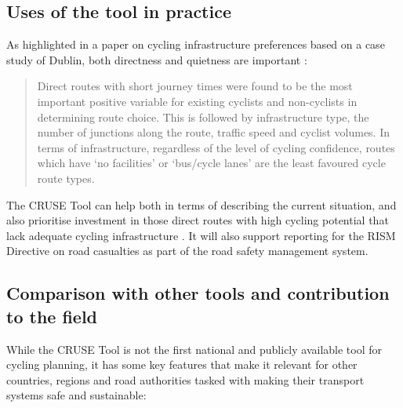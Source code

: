 \documentclass[
  super,
  preprint,
  3p]{elsarticle}
\begin{document}
\subsection{Uses of the tool in
practice}\label{uses-of-the-tool-in-practice}

As highlighted in a paper on cycling infrastructure preferences based on
a case study of Dublin, both directness and quietness are important
\citep{caulfield2012}:

\begin{quote}
Direct routes with short journey times were found to be the most
important positive variable for existing cyclists and non-cyclists in
determining route choice. This is followed by infrastructure type, the
number of junctions along the route, traffic speed and cyclist volumes.
In terms of infrastructure, regardless of the level of cycling
confidence, routes which have `no facilities' or `bus/cycle lanes' are
the least favoured cycle route types.
\end{quote}

The CRUSE Tool can help both in terms of describing the current
situation, and also prioritise investment in those direct routes with
high cycling potential that lack adequate cycling infrastructure
\citep{caulfield2012}. It will also support reporting for the RISM
Directive on road casualties as part of the road safety management
system.

\subsection{Comparison with other tools and contribution to the
field}\label{comparison-with-other-tools-and-contribution-to-the-field}

While the CRUSE Tool is not the first national and publicly available
tool for cycling planning, it has some key features that make it
relevant for other countries, regions and road authorities tasked with
making their transport systems safe and sustainable:
\end{document}
